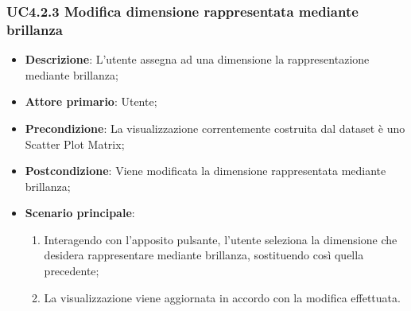 \subsubsection{UC4.2.3 Modifica dimensione rappresentata mediante brillanza}
\label{ssub:uc4.2.3}
\begin{itemize}

    \item \textbf{Descrizione}:     L'utente assegna ad una dimensione la rappresentazione mediante brillanza;
    \item \textbf{Attore primario}: Utente;
    \item \textbf{Precondizione}:   La visualizzazione correntemente costruita dal dataset è uno Scatter Plot Matrix;
    \item \textbf{Postcondizione}:  Viene modificata la dimensione rappresentata mediante brillanza;
    \item \textbf{Scenario principale}:
    \begin{enumerate}
        \item   Interagendo con l'apposito pulsante, l'utente seleziona la dimensione che desidera rappresentare 
                mediante brillanza, sostituendo così quella precedente;

        \item   La visualizzazione viene aggiornata in accordo con la modifica effettuata.
    \end{enumerate}
\end{itemize}

